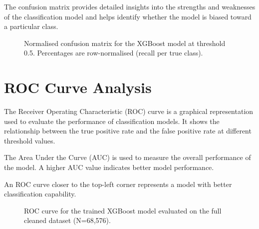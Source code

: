 The confusion matrix provides detailed insights into the strengths and weaknesses of the classification model and helps identify whether the model is biased toward a particular class.

\begin{figure}[htbp]
\centering
\renewcommand{\arraystretch}{1.4}
\setlength{\tabcolsep}{10pt}
\scriptsize
{}%
\caption{Normalised confusion matrix for the XGBoost model at threshold 0.5. Percentages are row-normalised (recall per true class).}
\label{fig:confusion_xgboost}
\end{figure}

\section{ROC Curve Analysis}

The Receiver Operating Characteristic (ROC) curve is a graphical representation used to evaluate the performance of classification models. It shows the relationship between the true positive rate and the false positive rate at different threshold values.

The Area Under the Curve (AUC) is used to measure the overall performance of the model. A higher AUC value indicates better model performance.

An ROC curve closer to the top-left corner represents a model with better classification capability.

\begin{figure}[htbp]
\centering
{}
\caption{ROC curve for the trained XGBoost model evaluated on the full cleaned dataset (N=68,576).}
\label{fig:roc_xgboost}
\end{figure}

